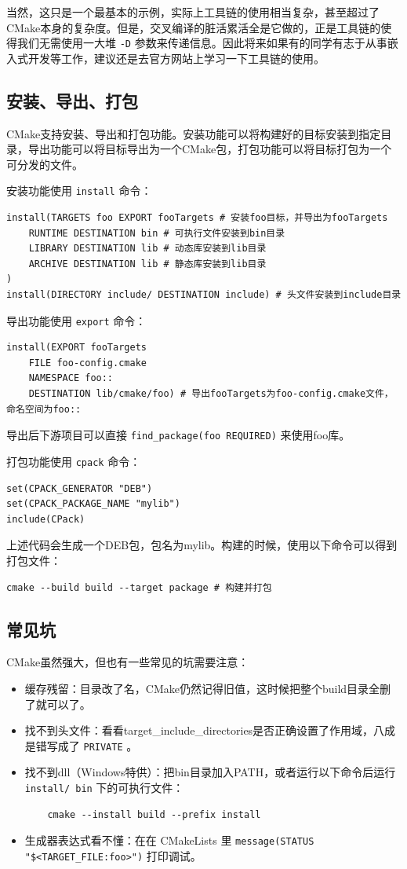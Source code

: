 当然，这只是一个最基本的示例，实际上工具链的使用相当复杂，甚至超过了CMake本身的复杂度。但是，交叉编译的脏活累活全是它做的，正是工具链的使得我们无需使用一大堆 \texttt{-D} 参数来传递信息。因此将来如果有的同学有志于从事嵌入式开发等工作，建议还是去官方网站上学习一下工具链的使用。

\subsection{安装、导出、打包}

CMake支持安装、导出和打包功能。安装功能可以将构建好的目标安装到指定目录，导出功能可以将目标导出为一个CMake包，打包功能可以将目标打包为一个可分发的文件。

安装功能使用 \texttt{install} 命令：
\begin{verbatim}
install(TARGETS foo EXPORT fooTargets # 安装foo目标，并导出为fooTargets
    RUNTIME DESTINATION bin # 可执行文件安装到bin目录
    LIBRARY DESTINATION lib # 动态库安装到lib目录
    ARCHIVE DESTINATION lib # 静态库安装到lib目录
)
install(DIRECTORY include/ DESTINATION include) # 头文件安装到include目录
\end{verbatim}

导出功能使用 \texttt{export} 命令：
\begin{verbatim}
install(EXPORT fooTargets
    FILE foo-config.cmake
    NAMESPACE foo::
    DESTINATION lib/cmake/foo) # 导出fooTargets为foo-config.cmake文件，命名空间为foo::
\end{verbatim}
导出后下游项目可以直接 \texttt{find\_package(foo REQUIRED)} 来使用foo库。

打包功能使用 \texttt{cpack} 命令：
\begin{verbatim}
set(CPACK_GENERATOR "DEB")
set(CPACK_PACKAGE_NAME "mylib")
include(CPack)
\end{verbatim}
上述代码会生成一个DEB包，包名为mylib。构建的时候，使用以下命令可以得到打包文件：
\begin{verbatim}
cmake --build build --target package # 构建并打包
\end{verbatim}

\subsection{常见坑}
CMake虽然强大，但也有一些常见的坑需要注意：
\begin{itemize}
    \item 缓存残留：目录改了名，CMake仍然记得旧值，这时候把整个build目录全删了就可以了。
    \item 找不到头文件：看看target\_include\_directories是否正确设置了作用域，八成是错写成了 \texttt{PRIVATE} 。
    \item 找不到dll（Windows特供）：把bin目录加入PATH，或者运行以下命令后运行 \texttt{install/ bin} 下的可执行文件：
\begin{verbatim}
    cmake --install build --prefix install
\end{verbatim}
    \item 生成器表达式看不懂：在在 CMakeLists 里  \texttt{message(STATUS "\$<TARGET\_FILE:foo>")}  打印调试。
\end{itemize}

